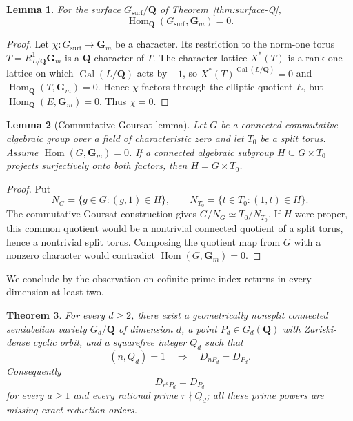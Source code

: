 \documentclass[11pt,letterpaper,reqno]{amsart}
\newtheorem{theorem}{Theorem}[section]
\newtheorem{lemma}[theorem]{Lemma}
\theoremstyle{definition}
\theoremstyle{remark}
\newcommand{\Gm}{\mathbf G_m}
\newcommand{\Q}{\mathbf Q}
\newcommand{\Hom}{\operatorname{Hom}}
\newcommand{\Gal}{\operatorname{Gal}}
\begin{document}
\begin{lemma}
\label{lem:no-characters}
For the surface $G_{\mathrm{surf}}/\Q$ of Theorem~\ref{thm:surface-Q},
\[
 \Hom_\Q(G_{\mathrm{surf}},\Gm)=0.
\]
\end{lemma}

\begin{proof}
Let $\chi:G_{\mathrm{surf}}\to\Gm$ be a character.  Its restriction to the
norm-one torus $T=R^1_{L/\Q}\Gm$ is a $\Q$-character of $T$.  The character
lattice $X^*(T)$ is a rank-one lattice on which
$\Gal(L/\Q)$ acts by $-1$, so $X^*(T)^{\Gal(L/\Q)}=0$ and
$\Hom_\Q(T,\Gm)=0$.  Hence $\chi$ factors through the elliptic quotient
$E$, but $\Hom_\Q(E,\Gm)=0$.  Thus $\chi=0$.
\end{proof}

\begin{lemma}[Commutative Goursat lemma]\label{lem:goursat}
Let $G$ be a connected commutative algebraic group over a field of
characteristic zero and let $T_0$ be a split torus.  Assume
$\Hom(G,\Gm)=0$.  If a connected algebraic subgroup
$H\subseteq G\times T_0$ projects surjectively onto both factors, then
$H=G\times T_0$.
\end{lemma}

\begin{proof}
Put
\[
 N_G=\{g\in G:(g,1)\in H\},
 \qquad
 N_{T_0}=\{t\in T_0:(1,t)\in H\}.
\]
The commutative Goursat construction gives
$G/N_G\simeq T_0/N_{T_0}$.  If $H$ were proper, this common quotient would be
a nontrivial connected quotient of a split torus, hence a nontrivial split
torus.  Composing the quotient map from $G$ with a nonzero character would
contradict $\Hom(G,\Gm)=0$.
\end{proof}

We conclude by the observation on cofinite prime-index returns in every dimension at least two.
\begin{theorem}
\label{thm:all-dimensions}
For every $d\ge2$, there exist a geometrically nonsplit connected
semiabelian variety $G_d/\Q$ of dimension $d$, a point $P_d\in G_d(\Q)$ with
Zariski-dense cyclic orbit, and a squarefree integer $Q_d$ such that
\[
 (n,Q_d)=1\quad\Longrightarrow\quad D_{nP_d}=D_{P_d}.
\]
Consequently
\[
 D_{r^{a}P_d}=D_{P_d}
\]
for every $a\ge1$ and every rational prime $r\nmid Q_d$; all these prime
powers are missing exact reduction orders.
\end{theorem}
\end{document}
